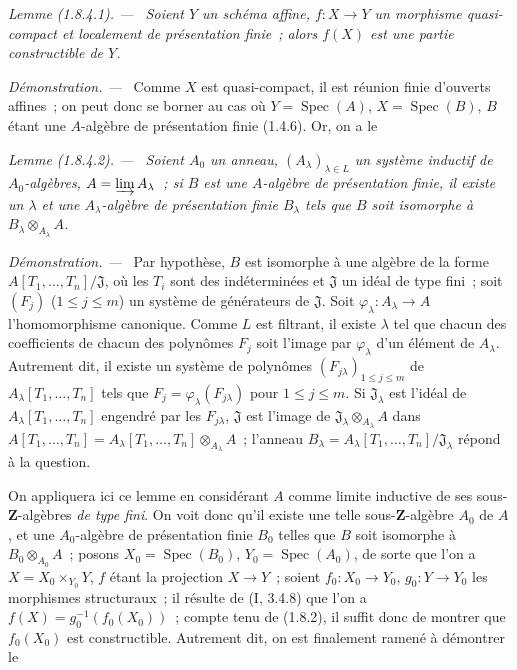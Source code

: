 \documentclass[10pt,oneside]{book}
\makeatletter
\newcommand{\setmanualcurrentlabel}[1]{\def\@currentlabel{#1}}
\newenvironment{lemma}[1][]{%
  \setmanualcurrentlabel{#1}\par\medskip\noindent\itshape Lemme (#1). ---\ }{\par}
\newenvironment{proof}{%
  \par\medskip\noindent\textit{Démonstration. ---\ }}{\par}
\makeatother
\begin{document}
\begin{lemma}[1.8.4.1]
\label{IV.1.8.4.1-fr}
Soient $Y$ un schéma affine, $f:X\to Y$ un morphisme quasi-compact et
localement de présentation finie~; alors $f(X)$ est une partie constructible
de $Y$.
\end{lemma}

\begin{proof}
Comme $X$ est quasi-compact, il est réunion finie d'ouverts affines~; on peut
donc se borner au cas où $Y=\operatorname{Spec}(A)$,
$X=\operatorname{Spec}(B)$, $B$ étant une $A$-algèbre de présentation finie
(1.4.6). Or, on a le
\end{proof}

\begin{lemma}[1.8.4.2]
\label{IV.1.8.4.2-fr}
Soient $A_0$ un anneau, $(A_\lambda)_{\lambda\in L}$ un système inductif de
$A_0$-algèbres, $A=\varinjlim A_\lambda$~; si $B$ est une $A$-algèbre de
présentation finie, il existe un $\lambda$ et une $A_\lambda$-algèbre de
présentation finie $B_\lambda$ tels que $B$ soit isomorphe à
$B_\lambda\otimes_{A_\lambda}A$.
\end{lemma}

\begin{proof}
Par hypothèse, $B$ est isomorphe à une algèbre de la forme
$A[T_1,\ldots,T_n]/\mathfrak J$, où les $T_i$ sont des indéterminées et
$\mathfrak J$ un idéal de type fini~; soit $(F_j)$ ($1\leq j\leq m$) un
système de générateurs de $\mathfrak J$. Soit
$\varphi_\lambda:A_\lambda\to A$ l'homomorphisme canonique. Comme $L$ est
filtrant, il existe $\lambda$ tel que chacun des coefficients de chacun des
polynômes $F_j$ soit l'image par $\varphi_\lambda$ d'un élément de
$A_\lambda$. Autrement dit, il existe un système de polynômes
$(F_{j\lambda})_{1\leq j\leq m}$ de $A_\lambda[T_1,\ldots,T_n]$ tels que
$F_j=\varphi_\lambda(F_{j\lambda})$ pour $1\leq j\leq m$. Si
$\mathfrak J_\lambda$ est l'idéal de $A_\lambda[T_1,\ldots,T_n]$ engendré
par les $F_{j\lambda}$, $\mathfrak J$ est l'image de
$\mathfrak J_\lambda\otimes_{A_\lambda}A$ dans
$A[T_1,\ldots,T_n]=A_\lambda[T_1,\ldots,T_n]\otimes_{A_\lambda}A$~;
l'anneau $B_\lambda=A_\lambda[T_1,\ldots,T_n]/\mathfrak J_\lambda$ répond à
la question.
\end{proof}

On appliquera ici ce lemme en considérant $A$ comme limite inductive de ses
sous-$\mathbf Z$-algèbres \emph{de type fini}. On voit donc qu'il existe une
telle sous-$\mathbf Z$-algèbre $A_0$ de $A$, et une $A_0$-algèbre de
présentation finie $B_0$ telles que $B$ soit isomorphe à
$B_0\otimes_{A_0}A$~; posons $X_0=\operatorname{Spec}(B_0)$,
$Y_0=\operatorname{Spec}(A_0)$, de sorte que l'on a $X=X_0\times_{Y_0}Y$,
$f$ étant la projection $X\to Y$~; soient $f_0:X_0\to Y_0$,
$g_0:Y\to Y_0$ les morphismes structuraux~; il résulte de (I, 3.4.8) que
l'on a $f(X)=g_0^{-1}(f_0(X_0))$~; compte tenu de (1.8.2), il suffit donc de
montrer que $f_0(X_0)$ est constructible. Autrement dit, on est finalement
ramené à démontrer le
\end{document}
